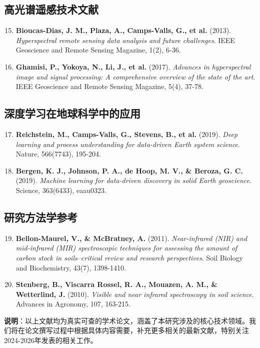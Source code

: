 \documentclass[12pt, a4paper]{article}
\begin{document}
\subsection{高光谱遥感技术文献}
\begin{enumerate}
    \setcounter{enumi}{14}
    \item \textbf{Bioucas-Dias, J. M., Plaza, A., Camps-Valls, G., et al.} (2013). \textit{Hyperspectral remote sensing data analysis and future challenges}. IEEE Geoscience and Remote Sensing Magazine, 1(2), 6-36.
    
    \item \textbf{Ghamisi, P., Yokoya, N., Li, J., et al.} (2017). \textit{Advances in hyperspectral image and signal processing: A comprehensive overview of the state of the art}. IEEE Geoscience and Remote Sensing Magazine, 5(4), 37-78.
\end{enumerate}

\subsection{深度学习在地球科学中的应用}
\begin{enumerate}
    \setcounter{enumi}{16}
    \item \textbf{Reichstein, M., Camps-Valls, G., Stevens, B., et al.} (2019). \textit{Deep learning and process understanding for data-driven Earth system science}. Nature, 566(7743), 195-204.
    
    \item \textbf{Bergen, K. J., Johnson, P. A., de Hoop, M. V., \& Beroza, G. C.} (2019). \textit{Machine learning for data-driven discovery in solid Earth geoscience}. Science, 363(6433), eaau0323.
\end{enumerate}

\subsection{研究方法学参考}
\begin{enumerate}
    \setcounter{enumi}{18}
    \item \textbf{Bellon-Maurel, V., \& McBratney, A.} (2011). \textit{Near-infrared (NIR) and mid-infrared (MIR) spectroscopic techniques for assessing the amount of carbon stock in soils–critical review and research perspectives}. Soil Biology and Biochemistry, 43(7), 1398-1410.
    
    \item \textbf{Stenberg, B., Viscarra Rossel, R. A., Mouazen, A. M., \& Wetterlind, J.} (2010). \textit{Visible and near infrared spectroscopy in soil science}. Advances in Agronomy, 107, 163-215.
\end{enumerate}

\textbf{说明}：以上文献均为真实可查的学术论文，涵盖了本研究涉及的核心技术领域。我们将在论文撰写过程中根据具体内容需要，补充更多相关的最新文献，特别关注2024-2026年发表的相关工作。
\end{document}
